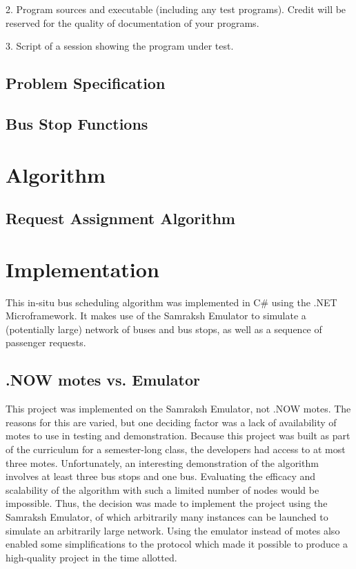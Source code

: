 \documentclass[runningheads]{llncs}
\begin{document}
2. Program sources and executable (including any test programs). Credit will be reserved for the quality of documentation of your programs.

3. Script of a session showing the program under test.

\subsection{Problem Specification}
\subsection{Bus Stop Functions}

\section{Algorithm}
\subsection{Request Assignment Algorithm}

\section{Implementation}
This in-situ bus scheduling algorithm was implemented in C\# using the .NET Microframework. It makes use of the Samraksh Emulator to simulate a (potentially large) network of buses and bus stops, as well as a sequence of passenger requests.

\subsection{.NOW motes vs. Emulator}
This project was implemented on the Samraksh Emulator, not .NOW motes. The reasons for this are varied, but one deciding factor was a lack of availability of motes to use in testing and demonstration. Because this project was built as part of the curriculum for a semester-long class, the developers had access to at most three motes. Unfortunately, an interesting demonstration of the algorithm involves at least three bus stops and one bus. Evaluating the efficacy and scalability of the algorithm with such a limited number of nodes would be impossible. Thus, the decision was made to implement the project using the Samraksh Emulator, of which arbitrarily many instances can be launched to simulate an arbitrarily large network. Using the emulator instead of motes also enabled some simplifications to the protocol which made it possible to produce a high-quality project in the time allotted.
\end{document}
